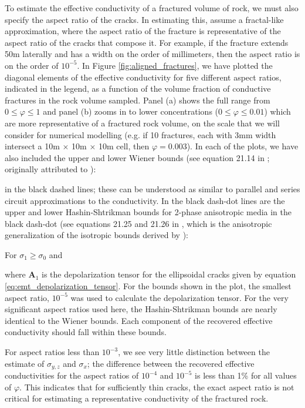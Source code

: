 

To estimate the effective conductivity of a fractured volume of rock, we must also specify the aspect ratio of the cracks. In estimating this, assume a fractal-like approximation, where the aspect ratio of the fracture is representative of the aspect ratio of the cracks that compose it. For example, if the fracture extends 50m laterally and has a width on the order of millimeters, then the aspect ratio is on the order of $10^{-5}$. In Figure \ref{fig:aligned_fractures}, we have plotted the diagonal elements of the effective conductivity for five different aspect ratios, indicated in the legend, as a function of the volume fraction of conductive fractures in the rock volume sampled. Panel (a) shows the full range from $0 \leq \varphi \leq 1$ and panel (b) zooms in to lower concentrations ($0 \leq \varphi \leq 0.01$) which are more representative of a fractured rock volume, on the scale that we will consider for numerical modelling (e.g. if 10 fractures, each with 3mm width intersect a 10m $\times$ 10m $\times$ 10m cell, then $\varphi = 0.003$). In each of the plots, we have also included the upper and lower Wiener bounds (see equation 21.14 in \cite{Torquato2002}; originally attributed to \cite{Wiener1912}):

in the black dashed lines; these can be understood as similar to parallel and series circuit approximations to the conductivity. In the black dash-dot lines are the upper and lower Hashin-Shtrikman bounds for 2-phase anisotropic media in the black dash-dot (see equations 21.25 and 21.26 in \cite{Torquato2002}, which is the anisotropic generalization of the isotropic bounds derived by \cite{Hashin1962}):

For $\sigma_1 \geq \sigma_0$ and

where $\mathbf{A}_1$ is the depolarization tensor for the ellipsoidal cracks given by equation \ref{eq:emt_depolarization_tensor}. For the bounds shown in the plot, the smallest aspect ratio, $10^{-5}$ was used to calculate the depolarization tensor. For the very significant aspect ratios used here, the Hashin-Shtrikman bounds are nearly identical to the Wiener bounds. Each component of the recovered effective conductivity should fall within these bounds.



For aspect ratios less than $10^{-3}$, we see very little distinction between the estimate of $\sigma_{y, z}$ and $\sigma_{x}$; the difference between the recovered effective conductivities for the aspect ratios of $10^{-4}$ and $10^{-5}$ is less than 1\% for all values of $\varphi$. This indicates that for sufficiently thin cracks, the exact aspect ratio is not critical for estimating a representative conductivity of the fractured rock.

